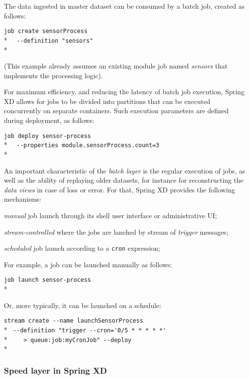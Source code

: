 The data ingested in master dataset can be consumed by a batch job, created 
as follows:

\verb;job create sensorProcess;\\*
\verb;  --definition "sensors";\\*

(This example already assumes an existing module job named \emph{sensors} that 
implements the processing logic).

For maximum efficiency, and reducing the latency of batch job execution, Spring 
XD allows for jobs to be divided into partitions that can be executed 
concurrently on separate containers. Such execution parameters are defined 
during deployment, as follows:

\verb;job deploy sensor-process;\\*
\verb;  --properties module.sensorProcess.count=3;\\*

An important characteristic of the \emph{batch layer} is the regular
execution of jobs, as well as the ability of replaying older datasets, for
instance for reconstructing the \emph{data views} in case of loss or error.
For that, Spring XD provides the following mechanisms:

\begin{itemize*}
\item \emph{manual} job launch through its shell user interface or 
administrative UI;
\item \emph{stream-controlled} where the jobs are lanched by stream of 
\emph{trigger} messages;
\item \emph{scheduled} job launch according to a \texttt{cron} expression;
\end{itemize*}

For example, a job can be launched manually as follows:

\verb;job launch sensor-process;\\*

Or, more typically, it can be launched on a schedule:

\verb;stream create --name launchSensorProcess;\\*
\verb; --definition "trigger --cron='0/5 * * * * *';\\* 
\verb;    > queue:job:myCronJob" --deploy;\\*

\subsubsection {Speed layer in Spring XD}


